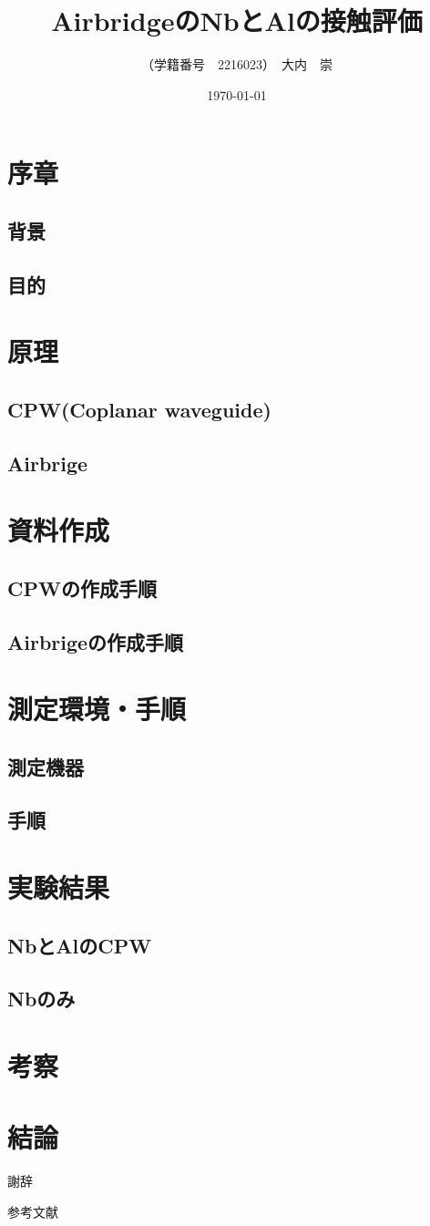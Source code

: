 \documentclass{jsarticle}
\title{AirbridgeのNbとAlの接触評価}
\author{（学籍番号　2216023）　大内　崇}
\date{\today}
\begin{document}
\maketitle

\tableofcontents

\section{序章}
\subsection{背景}
\subsection{目的}

\section{原理}
\subsection{CPW(Coplanar waveguide)}
\subsection{Airbrige}

\section{資料作成}
\subsection{CPWの作成手順}
\subsection{Airbrigeの作成手順}

\section{測定環境・手順}
\subsection{測定機器}
\subsection{手順}

\section{実験結果}
\subsection{NbとAlのCPW}
\subsection{Nbのみ}

\section{考察}


\section{結論}

謝辞

参考文献
\end{document}
